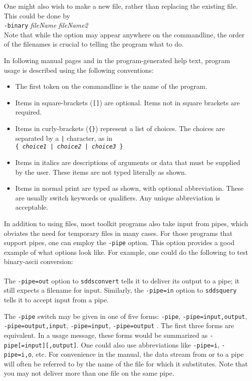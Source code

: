 \documentclass[11pt]{article}
\begin{document}
One might also wish to make a new file, rather than replacing the existing file.  This could be done by\\
\hspace*{5mm}{\tt sddsconvert} {\tt -binary} {\em fileName} {\em fileName2} \\
Note that while the option may appear anywhere on the commandline, the order of the filenames is crucial to
telling the program what to do.

In following manual pages and in the program-generated help text, program usage is described using the following
conventions:
\begin{itemize}
  \item The first token on the commandline  is the name of the program.
  \item Items in square-brackets ({\tt []}) are optional.  Items not in square brackets are required.
  \item Items in curly-brackets ({\tt \{\}}) represent a list of choices.  The choices are separated by
a \verb+|+ character, as in\\
{\tt \{ {\em choice1} | {\em choice2} | {\em choice3} \}}
  \item Items in italics are descriptions of arguments or data that must be supplied by the user.  These items are not typed
literally as shown.
  \item Items in normal print are typed as shown, with optional abbreviation.  These are
usually switch keywords or qualifiers.  Any unique abbreviation is acceptable.
\end{itemize}

In addition to using files, most toolkit programs also take input from pipes, which obviates the need for temporary
files in many cases.  For those programs that support pipes, one can employ the {\tt -pipe} option.  This option
provides a good example of what options look like.  For example, one could do the following to test binary-ascii
conversion:\\
\\
The {\tt -pipe=out} option to {\tt sddsconvert} tells it to deliver its output to a pipe; it still
expects a filename for input.  Similarly, the {\tt -pipe=in} option to {\tt sddsquery} tells it to
accept input from a pipe.

The {\tt -pipe} switch may be given in one of five forms: {\tt -pipe}, {\tt -pipe=input,output}, {\tt
-pipe=output,input}, {\tt -pipe=input}, {\tt -pipe=output} .  The first three forms are equivalent.  In a usage
message, these forms would be summarized as {\tt -pipe[=input][,output]}.  One could also use abbreviations like
{\tt -pipe=i}, {\tt -pipe=i,o}, etc.  For convenience in the manual, the data stream from or to a pipe will
often be referred to by the name of the file for which it substitutes.  Note that you may not deliver more
than one file on the same pipe.
\end{document}
